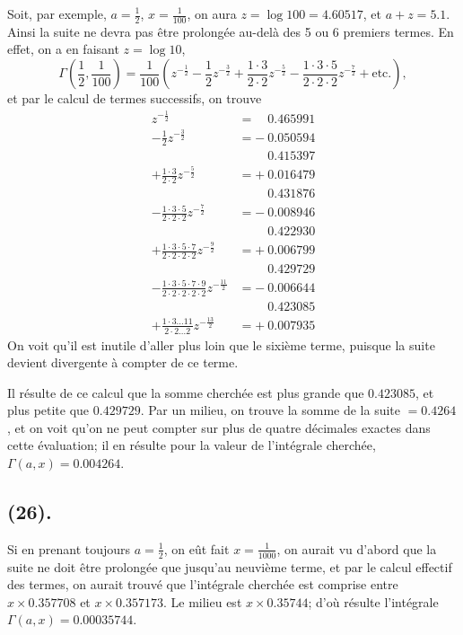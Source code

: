 \documentclass{article}
\begin{document}
Soit, par exemple, $a=\frac{1}{2}$, $x=\frac{1}{100}$, on aura $z=\log 100=4.60517$, et $a+z=5.1$. Ainsi la suite ne devra pas être prolongée au-delà des 5 ou 6 premiers termes. En effet, on a en faisant $z=\log 10$,
\[ \Gamma\left(\frac{1}{2},\frac{1}{100}\right)=\frac{1}{100}\left(z^{-\frac{1}{2}}-\frac{1}{2}z^{-\frac{3}{2}}+\frac{1\cdot3}{2\cdot2}z^{-\frac{5}{2}}-\frac{1\cdot3\cdot5}{2\cdot2\cdot2}z^{-\frac{7}{2}}+\text{etc.}\right), \]
et par le calcul de termes successifs, on trouve
\[ \begin{aligned} z^{-\frac{1}{2}}&=\phantom{+\ }0.465991\\ -\frac{1}{2}z^{-\frac{3}{2}}&=-\ 0.050594\\ &\phantom{=+\ }0.415397\\ +\frac{1\cdot3}{2\cdot2}z^{-\frac{5}{2}}&=+\ 0.016479\\ &\phantom{=+\ }0.431876\\ -\frac{1\cdot3\cdot5}{2\cdot2\cdot2}z^{-\frac{7}{2}}&=-\ 0.008946\\ &\phantom{=+\ }0.422930\\ +\frac{1\cdot3\cdot5\cdot7}{2\cdot2\cdot2\cdot2}z^{-\frac{9}{2}}&=+\ 0.006799\\ &\phantom{=+\ }0.429729\\ -\frac{1\cdot3\cdot5\cdot7\cdot9}{2\cdot2\cdot2\cdot2\cdot2}z^{-\frac{11}{2}}&=-\ 0.006644\\ &\phantom{=+\ }0.423085\\ +\frac{1\cdot3\ldots11}{2\cdot2\ldots2}z^{-\frac{13}{2}}&=+\ 0.007935 \end{aligned} \]
On voit qu'il est inutile d'aller plus loin que le sixième terme, puisque la suite devient divergente à compter de ce terme.

Il résulte de ce calcul que la somme cherchée est plus grande que $0.423085$, et plus petite que $0.429729$. Par un milieu, on trouve la somme de la suite $=0.4264$, et on voit qu'on ne peut compter sur plus de quatre décimales exactes dans cette évaluation; il en résulte pour la valeur de l'intégrale cherchée, $\Gamma(a,x)=0.004264$.

\subsection*{(26).}

Si en prenant toujours $a=\frac{1}{2}$, on eût fait $x=\frac{1}{1000}$, on aurait vu d'abord que la suite ne doit être prolongée que jusqu'au neuvième terme, et par le calcul effectif des termes, on aurait trouvé que l'intégrale cherchée est comprise entre $x\times0.357708$ et $x\times0.357173$. Le milieu est $x\times0.35744$; d'où résulte l'intégrale $\Gamma(a,x)=0.00035744$.
\end{document}
